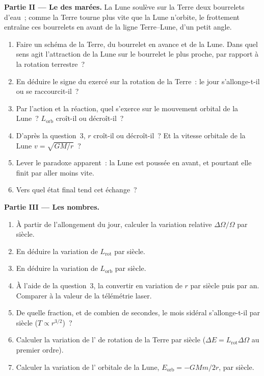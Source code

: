 \begin{problem}
\medskip
\noindent\textbf{Partie II --- Le  des marées.}
La Lune soulève sur la Terre deux bourrelets d'eau~; comme la Terre
tourne plus vite que la Lune n'orbite, le frottement entraîne ces
bourrelets en avant de la ligne Terre--Lune, d'un petit angle.
\begin{enumerate}[resume]
  \item Faire un schéma de la Terre, du bourrelet en avance et de la
        Lune. Dans quel sens agit l'attraction de la Lune sur le
        bourrelet le plus proche, par rapport à la rotation terrestre~?
  \item En déduire le signe du  exercé sur la rotation de la
        Terre~: le jour s'allonge-t-il ou se raccourcit-il~?
  \item Par l'action et la réaction, quel  s'exerce sur le
        mouvement orbital de la Lune~? $L_{\text{orb}}$ croît-il ou
        décroît-il~?
  \item D'après la question~3, $r$ croît-il ou décroît-il~? Et la vitesse
        orbitale de la Lune $v = \sqrt{GM/r}$~?
  \item Lever le paradoxe apparent~: la Lune est poussée en avant, et
        pourtant elle finit par aller moins vite.
  \item Vers quel état final tend cet échange~?
\end{enumerate}

\medskip
\noindent\textbf{Partie III --- Les nombres.}
\begin{enumerate}[resume]
  \item À partir de l'allongement du jour, calculer la variation
        relative $\Delta\Omega/\Omega$ par siècle.
  \item En déduire la variation de $L_{\text{rot}}$ par siècle.
  \item En déduire la variation de $L_{\text{orb}}$ par siècle.
  \item À l'aide de la question~3, la convertir en variation de $r$ par
        siècle puis par an. Comparer à la valeur de la télémétrie laser.
  \item De quelle fraction, et de combien de secondes, le mois sidéral
        s'allonge-t-il par siècle ($T \propto r^{3/2}$)~?
  \item Calculer la variation de l' de rotation de la
        Terre par siècle ($\Delta E = L_{\text{rot}}\Delta\Omega$ au
        premier ordre).
  \item Calculer la variation de l' orbitale de la Lune,
        $E_{\text{orb}} = -GMm/2r$, par siècle.
\end{enumerate}


\end{problem}
